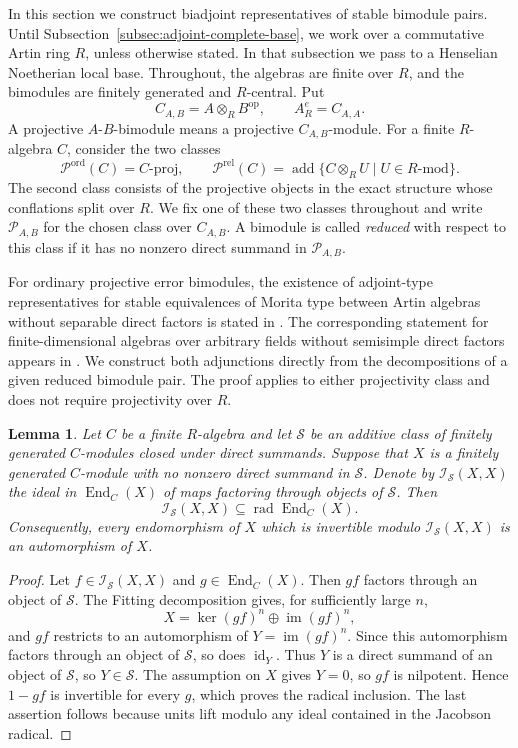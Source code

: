 \documentclass[12pt,a4paper,english,reqno]{amsart}
\numberwithin{equation}{section}
\theoremstyle{plain}
\newtheorem{lemma}[theorem]{Lemma}
\theoremstyle{definition}
\begin{document}
In this section we construct biadjoint representatives of
stable bimodule pairs. Until Subsection~\ref{subsec:adjoint-complete-base},
we work over a commutative Artin ring $R$, unless otherwise
stated. In that subsection we pass to a Henselian Noetherian
local base. Throughout, the algebras are finite over $R$, and
the bimodules are finitely generated and $R$-central. Put
\[
 C_{A,B}=A\otimes_R B^{\mathrm{op}},
 \qquad A^e_R=C_{A,A}.
\]
A projective $A$-$B$-bimodule means a projective $C_{A,B}$-module.
For a finite $R$-algebra $C$, consider the two classes
\[
 \mathcal P^{\mathrm{ord}}(C)=C\text{-}\mathrm{proj},
 \qquad
 \mathcal P^{\mathrm{rel}}(C)
 =\operatorname{add}\{C\otimes_RU\mid U\in R\text{-}\mathrm{mod}\}.
\]
The second class consists of the projective objects in the exact structure
whose conflations split over $R$.  We fix one of these two classes
throughout and write $\mathcal P_{A,B}$ for the chosen class over $C_{A,B}$.
A bimodule is called \emph{reduced} with respect to this class if it has no
nonzero direct summand in $\mathcal P_{A,B}$.

For ordinary projective error bimodules, the existence of adjoint-type
representatives for stable equivalences of Morita type between Artin
algebras without separable direct factors is stated in
\cite[Lemma~3.11]{XZ2026}.  The corresponding statement for
finite-dimensional algebras over arbitrary fields without semisimple
direct factors appears in
\cite[Lemma~4.1]{CPX2012}.  We construct both adjunctions directly from
the decompositions of a given reduced bimodule pair.  The proof applies
to either projectivity class and does not require projectivity over $R$.

\begin{lemma}
\label{lem:projective-factorization-radical}
Let $C$ be a finite $R$-algebra and let $\mathcal S$ be an additive
class of finitely generated $C$-modules closed under direct summands.
Suppose that $X$ is a finitely generated $C$-module with no nonzero direct
summand in $\mathcal S$.  Denote by
$\mathcal I_{\mathcal S}(X,X)$ the ideal in
$\operatorname{End}_C(X)$ of maps factoring through objects of
$\mathcal S$.  Then
\[
 \mathcal I_{\mathcal S}(X,X)
 \subseteq \operatorname{rad}\operatorname{End}_C(X).
\]
Consequently, every endomorphism of $X$ which is invertible modulo
$\mathcal I_{\mathcal S}(X,X)$ is an automorphism of $X$.
\end{lemma}

\begin{proof}
Let $f\in\mathcal I_{\mathcal S}(X,X)$ and
$g\in\operatorname{End}_C(X)$.  Then $gf$ factors through an object
of $\mathcal S$.  The Fitting decomposition gives, for sufficiently large $n$,
\[
 X=\ker(gf)^n\oplus\operatorname{im}(gf)^n,
\]
and $gf$ restricts to an automorphism of
$Y=\operatorname{im}(gf)^n$.  Since this automorphism factors through
an object of $\mathcal S$, so does $\operatorname{id}_Y$.  Thus $Y$ is a direct summand
of an object of $\mathcal S$, so $Y\in\mathcal S$.
The assumption on $X$ gives $Y=0$, so $gf$ is nilpotent.  Hence
$1-gf$ is invertible for every $g$, which proves the radical inclusion.
The last assertion follows because units lift modulo any ideal
contained in the Jacobson radical.
\end{proof}
\end{document}
